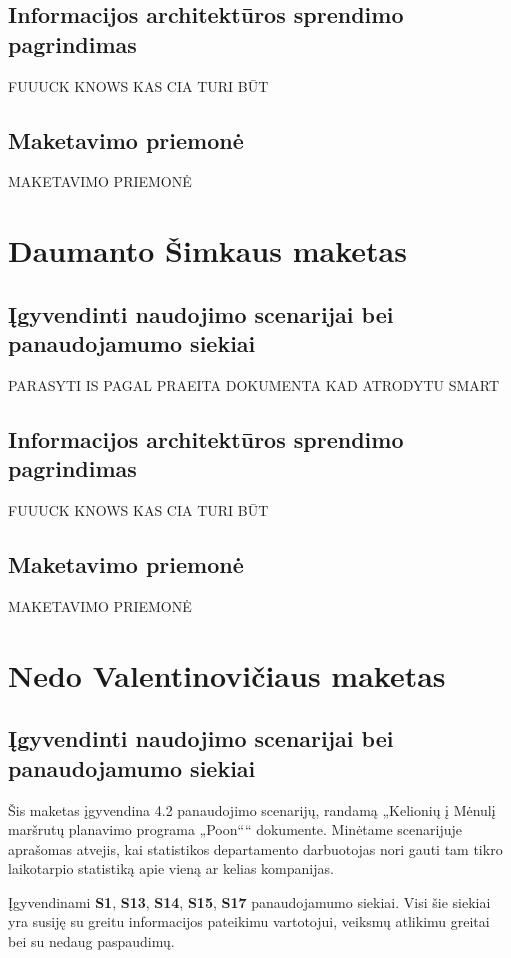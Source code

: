 \documentclass{VUMIFPSkursinis}
\begin{document}
\subsection{Informacijos architektūros sprendimo pagrindimas}
FUUUCK KNOWS KAS CIA TURI BŪT

\subsection{Maketavimo priemonė}
MAKETAVIMO PRIEMONĖ

\section{Daumanto Šimkaus maketas}
\subsection{Įgyvendinti naudojimo scenarijai bei panaudojamumo siekiai}
PARASYTI IS PAGAL PRAEITA DOKUMENTA KAD ATRODYTU SMART

\subsection{Informacijos architektūros sprendimo pagrindimas}
FUUUCK KNOWS KAS CIA TURI BŪT

\subsection{Maketavimo priemonė}
MAKETAVIMO PRIEMONĖ

\section{Nedo Valentinovičiaus maketas}
\subsection{Įgyvendinti naudojimo scenarijai bei panaudojamumo siekiai}
Šis maketas įgyvendina 4.2 panaudojimo scenarijų, randamą „Kelionių į Mėnulį maršrutų planavimo programa „Poon““ dokumente. Minėtame scenarijuje aprašomas atvejis, kai statistikos departamento darbuotojas nori gauti tam tikro laikotarpio statistiką apie vieną ar kelias kompanijas. 

Įgyvendinami \textbf{S1}, \textbf{S13}, \textbf{S14}, \textbf{S15}, \textbf{S17} panaudojamumo siekiai. Visi šie siekiai yra susiję su greitu informacijos pateikimu vartotojui, veiksmų atlikimu greitai bei su nedaug paspaudimų.
\end{document}
